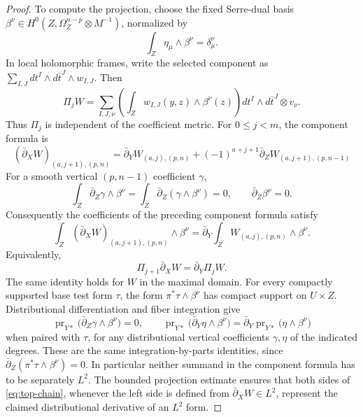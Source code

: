 \documentclass[11pt,reqno]{amsart}
\numberwithin{equation}{section}
\theoremstyle{definition}
\theoremstyle{remark}
\begin{document}
\begin{proof}
To compute the projection, choose the fixed Serre-dual basis
$\beta^\nu\in H^0(Z,\Omega_Z^{n-p}\otimes M^{-1})$, normalized by
\[
 \int_Z\eta_\mu\wedge\beta^\nu=\delta_\mu^\nu.
\]
In local holomorphic frames, write the selected component as
$\sum_{I,J}dt^I\wedge d\bar t^J\wedge w_{I,J}$.  Then
\[
 \Pi_jW
 =\sum_{I,J,\nu}
       \left(\int_Zw_{I,J}(y,z)\wedge\beta^\nu(z)\right)
                      dt^I\wedge d\bar t^J\otimes v_\nu.
\]
Thus $\Pi_j$ is independent of the coefficient metric.  For
$0\le j<m$, the component formula is
\[
 (\bar\partial_XW)_{(a,j+1),(p,n)}
 =\bar\partial_YW_{(a,j),(p,n)}
   +(-1)^{a+j+1}\bar\partial_ZW_{(a,j+1),(p,n-1)}
\]
For a smooth vertical $(p,n-1)$ coefficient $\gamma$,
\[
 \int_Z\bar\partial_Z\gamma\wedge\beta^\nu
  =\int_Z\bar\partial_Z(\gamma\wedge\beta^\nu)=0,
 \qquad \bar\partial_Z\beta^\nu=0.
\]
Consequently the coefficients of the preceding component formula
satisfy
\[
 \int_Z(\bar\partial_XW)_{(a,j+1),(p,n)}\wedge\beta^\nu
  =\bar\partial_Y
        \int_ZW_{(a,j),(p,n)}\wedge\beta^\nu.
\]
Equivalently,
\begin{equation}\label{eq:top-chain}
 \Pi_{j+1}\bar\partial_XW=\bar\partial_Y\Pi_jW.
\end{equation}
The same identity holds for $W$ in the maximal domain.  For every
compactly supported base test form $\tau$, the form
$\pi^*\tau\wedge\beta^\nu$ has compact support on $U\times Z$.
Distributional differentiation and fiber integration give
\[
 \operatorname{pr}_{Y*}
       \bigl(\bar\partial_Z\gamma\wedge\beta^\nu\bigr)=0,\qquad
 \operatorname{pr}_{Y*}
       \bigl(\bar\partial_Y\eta\wedge\beta^\nu\bigr)
   =\bar\partial_Y\operatorname{pr}_{Y*}
       \bigl(\eta\wedge\beta^\nu\bigr)
\]
when paired with $\tau$, for any distributional vertical
coefficients $\gamma,\eta$ of the indicated degrees.  These are
the same integration-by-parts identities, since
$\bar\partial_Z(\pi^*\tau\wedge\beta^\nu)=0$.
In particular neither summand in the component formula has to be
separately $L^2$.  The bounded projection estimate ensures that
both sides of \eqref{eq:top-chain}, whenever the left side is
defined from $\bar\partial_XW\in L^2$, represent the claimed
distributional derivative of an $L^2$ form.


\end{proof}
\end{document}
